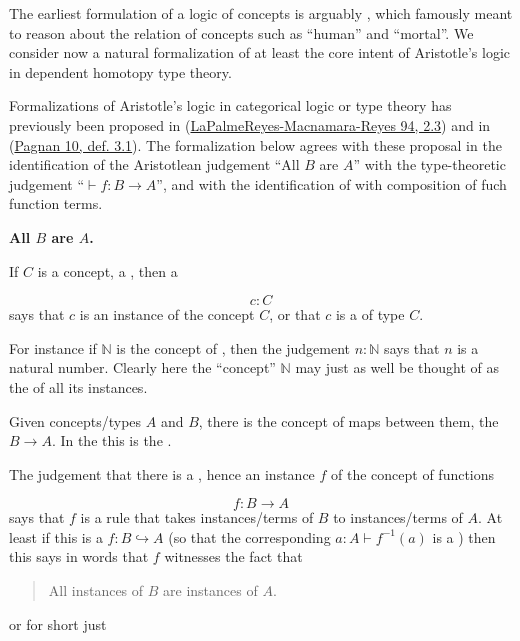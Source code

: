 \documentclass[12pt,titlepage]{article}
\theoremstyle{plain}
\theoremstyle{definition}
\theoremstyle{remark}
\begin{document}
The earliest formulation of a logic of concepts is arguably , which famously meant to reason about the relation of concepts such as ``human'' and ``mortal''. We consider now a natural formalization of at least the core intent of Aristotle's logic in dependent homotopy type theory.

Formalizations of Aristotle's logic in categorical logic or type theory has previously been proposed in (\hyperlink{PalmeReyesMacnamaraReyes94}{LaPalmeReyes-Macnamara-Reyes 94, 2.3}) and in (\hyperlink{Pagnan10}{Pagnan 10, def. 3.1}). The formalization below agrees with these proposal in the identification of the Aristotlean judgement ``All $B$ are $A$'' with the type-theoretic judgement ``$\vdash f \colon B\to A$'', and with the identification of  with composition of fuch function terms.

\textbf{All $B$ are $A$.}

If $C$ is a concept, a , then a 

\begin{displaymath}
c \colon C
\end{displaymath}
says that $c$ is an instance of the concept $C$, or that $c$ is a  of type $C$.

For instance if $\mathbb{N}$ is the concept of , then the judgement $n \colon \mathbb{N}$ says that $n$ is a natural number. Clearly here the ``concept'' $\mathbb{N}$ may just as well be thought of as the  of all its instances.

Given concepts/types $A$ and $B$, there is the concept of maps between them, the  $B\to A$. In the  this is the .

The judgement that there is a , hence an instance $f$ of the concept of functions

\begin{displaymath}
f \colon B \longrightarrow A
\end{displaymath}
says that $f$ is a rule that takes instances/terms of $B$ to instances/terms of $A$. At least if this is a  $f \colon B \hookrightarrow A$ (so that the corresponding $a\colon A \vdash f^{-1}(a)$ is a ) then this says in words that $f$ witnesses the fact that

\begin{quote}%
All instances of $B$ are instances of $A$.


\end{quote}
or for short just
\end{document}
